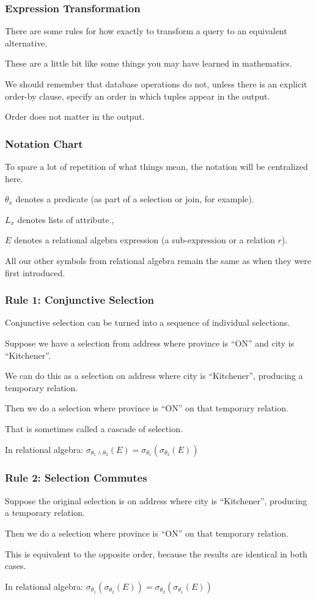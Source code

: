 \begin{frame}
\frametitle{Expression Transformation}

There are some rules for how exactly to transform a query to an equivalent alternative. 

These are a little bit like some things you may have learned in mathematics. 

We should remember that database operations do not, unless there is an explicit order-by clause, specify an order in which tuples appear in the output. 

Order does not matter in the output. 

\end{frame}

\begin{frame}
\frametitle{Notation Chart}

To spare a lot of repetition of what things mean, the notation will be centralized here. 

$\theta_{x}$ denotes a predicate (as part of a selection or join, for example).

$L_{x}$ denotes lists of attribute., 

$E$ denotes a relational algebra expression (a sub-expression or a relation $r$).

 All our other symbols from relational algebra remain the same as when they were first introduced.


\end{frame}

\begin{frame}
\frametitle{Rule 1: Conjunctive Selection}

Conjunctive selection can be turned into a sequence of individual selections.

Suppose we have a selection from address where province is ``ON'' and city is ``Kitchener''. 

We can do this as a selection on address where city is ``Kitchener'', producing a temporary relation. 

Then we do a selection where province is ``ON'' on that temporary relation. 

That is sometimes called a cascade of selection.

In relational algebra: $\sigma_{\theta_{1} \wedge \theta_{2}}(E) = \sigma_{\theta_{1}}(\sigma_{\theta_{2}}(E))$


\end{frame}


\begin{frame}
\frametitle{Rule 2: Selection Commutes}

Suppose the original selection is on address where city is ``Kitchener'', producing a temporary relation. 

Then we do a selection where province is ``ON'' on that temporary relation. 

This is equivalent to the opposite order, because the results are identical in both cases. 

In relational algebra: $\sigma_{\theta_{1}}(\sigma_{\theta_{2}}(E)) = \sigma_{\theta_{2}}(\sigma_{\theta_{1}}(E))$


\end{frame}

